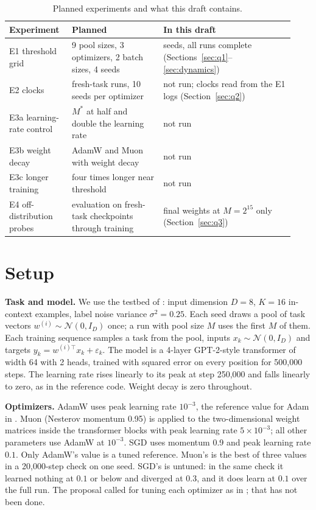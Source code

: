 \documentclass[11pt]{article}
\newcommand{\Mstar}{M^{*}}
\begin{document}
\begin{table}[!htb]
\centering\small
\caption{Planned experiments and what this draft contains.}
\label{tab:status}
\begin{tabular}{@{}p{0.2\linewidth}p{0.3\linewidth}p{0.43\linewidth}@{}}
\toprule
Experiment & Planned & In this draft \\
\midrule
E1 threshold grid & 9 pool sizes, 3 optimizers, 2 batch sizes, 4 seeds & \NSeeds{} seeds, all \NRuns{} runs complete (Sections~\ref{sec:q1}--\ref{sec:dynamics}) \\
\addlinespace
E2 clocks & fresh-task runs, 10 seeds per optimizer & not run; clocks read from the E1 logs (Section~\ref{sec:q2}) \\
\addlinespace
E3a learning-rate control & $\Mstar$ at half and double the learning rate & not run \\
\addlinespace
E3b weight decay & AdamW and Muon with weight decay & not run \\
\addlinespace
E3c longer training & four times longer near threshold & not run \\
\addlinespace
E4 off-distribution probes & evaluation on fresh-task checkpoints through training & final weights at $M = 2^{15}$ only (Section~\ref{sec:q3}) \\
\bottomrule
\end{tabular}
\end{table}

\section{Setup}
\label{sec:setup}

\textbf{Task and model.} We use the testbed of \citet{raventos2023}: input dimension $D = 8$, $K = 16$ in-context examples, label noise variance $\sigma^2 = 0.25$. Each seed draws a pool of task vectors $w^{(i)} \sim \mathcal{N}(0, I_D)$ once; a run with pool size $M$ uses the first $M$ of them. Each training sequence samples a task from the pool, inputs $x_k \sim \mathcal{N}(0, I_D)$ and targets $y_k = w^{(i)\top} x_k + \varepsilon_k$. The model is a 4-layer GPT-2-style transformer of width 64 with 2 heads, trained with squared error on every position for 500{,}000 steps. The learning rate rises linearly to its peak at step 250{,}000 and falls linearly to zero, as in the reference code. Weight decay is zero throughout.

\textbf{Optimizers.} AdamW uses peak learning rate $10^{-3}$, the reference value for Adam in \citet{raventos2023}. Muon (Nesterov momentum 0.95) is applied to the two-dimensional weight matrices inside the transformer blocks with peak learning rate $5 \times 10^{-3}$; all other parameters use AdamW at $10^{-3}$. SGD uses momentum 0.9 and peak learning rate $0.1$. Only AdamW's value is a tuned reference. Muon's is the best of three values in a 20{,}000-step check on one seed. SGD's is untuned: in the same check it learned nothing at $0.1$ or below and diverged at $0.3$, and it does learn at $0.1$ over the full run. The proposal called for tuning each optimizer as in \citet{wen2026}; that has not been done.
\end{document}
